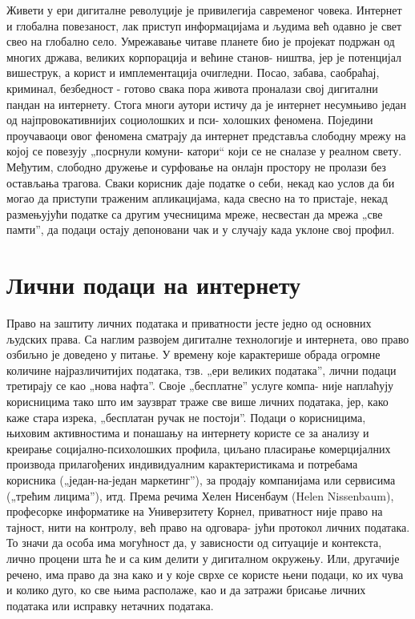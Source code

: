 \documentclass[a4paper]{article}
\begin{document}
Живети у ери дигиталне револуције је привилегија савременог човека. Интернет и глобална повезаност, лак приступ информацијама и људима већ одавно је свет свео на глобално село. Умрежавање читаве планете био је пројекат подржан од многих држава, великих корпорација и већине станов-
ништва, јер је потенцијал вишеструк, а корист и имплементација очигледни. Посао, забава, саобраћај, криминал, безбедност - готово свака пора живота проналази свој дигитални пандан на интернету. Стога многи аутори истичу да је интернет несумњиво један од најпровокативнијих социолошких и пси-
холошких феномена. Поједини проучаваоци овог феномена сматрају да интернет представља слободну мрежу на којој се повезују „посрнули комуни-
катори“ који се не сналазе у реалном свету. Међутим, слободно дружење и сурфовање на онлајн простору не пролази без остављања трагова. Сваки корисник даје податке о себи, некад као услов да би могао да приступи траженим апликацијама, када свесно на то пристаје, некад размењујући податке са другим учесницима мреже, несвестан да мрежа „све памти”, да подаци остају депоновани чак и у случају када уклоне свој профил.



\newpage
\section{Лични подаци на интернету}
\label{sec:naslov1} 

Право на заштиту личних података и приватности јесте једно од основних људских права. Са наглим развојем дигиталне технологије и интернета, ово право озбиљно је доведено у питање. У времену које карактерише обрада огромне количине најразличитијих података, тзв. „ери великих података”, лични подаци третирају се као „нова нафта”. Своје „бесплатне” услуге компа-
није наплаћују корисницима тако што им заузврат траже све више личних података, јер, како каже стара изрека, „бесплатан ручак не постоји”. Подаци о корисницима, њиховим активностима и понашању на интернету користе се за анализу и креирање социјално-психолошких профила, циљано пласирање комерцијалних производа прилагођених индивидуалним карактеристикама и потребама корисника („један-на-један маркетинг”), за продају компанијама или сервисима („трећим лицима”), итд. Према речима Хелен Нисенбаум (Helen Nissenbaum), професорке информатике на Универзитету Корнел, приватност није право на тајност, нити на контролу, већ право на одговара-
јући протокол личних података. То значи да особа има могућност да, у зависности од ситуације и контекста, лично процени шта ће и са ким делити у дигиталном окружењу. Или, другачије речено, има право да зна како и у које сврхе се користе њени подаци, ко их чува и колико дуго, ко све њима располаже, као и да затражи брисање личних података или исправку нетачних података.
\end{document}
